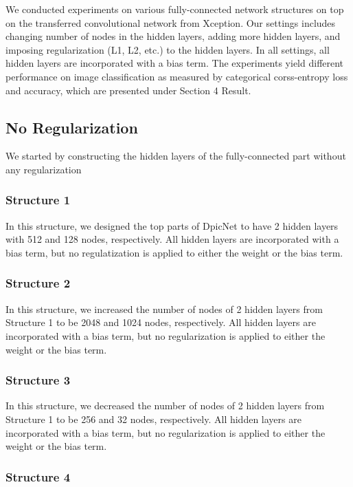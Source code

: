 \documentclass{article}
\begin{document}
We conducted experiments on various fully-connected network structures on top on the transferred convolutional network from Xception. Our settings includes changing number of nodes in the hidden layers, adding more hidden layers, and imposing regularization (L1, L2, etc.) to the hidden layers. In all settings, all hidden layers are incorporated with a bias term. The experiments yield different performance on image classification as measured by categorical corss-entropy loss and accuracy, which are presented under Section 4 Result.

\subsection{No Regularization}
We started by constructing the hidden layers of the fully-connected part without any regularization
\subsubsection{Structure 1}

In this structure, we designed the top parts of DpicNet to have 2 hidden layers with 512 and 128 nodes, respectively. All hidden layers are incorporated with a bias term, but no regulatization is applied to either the weight or the bias term.

\subsubsection{Structure 2}

In this structure, we increased the number of nodes of 2 hidden layers from Structure 1 to be 2048 and 1024 nodes, respectively. All hidden layers are incorporated with a bias term, but no regularization is applied to either the weight or the bias term.

\subsubsection{Structure 3}

In this structure, we decreased the number of nodes of 2 hidden layers from Structure 1 to be 256 and 32 nodes, respectively. All hidden layers are incorporated with a bias term, but no regularization is applied to either the weight or the bias term.

\subsubsection{Structure 4}
\end{document}
